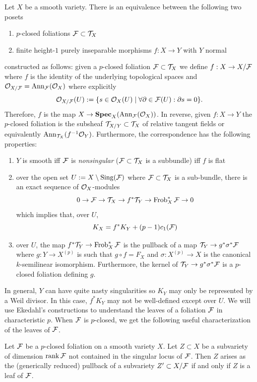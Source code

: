 \documentclass[main.tex]{subfiles}
\begin{document}
\begin{theorem}[Ekedahl] \label{thm:ekedahl}
Let $X$ be a smooth variety. There is an equivalence between the following two posets
\begin{enumerate}
    \item $p$-closed foliations $\mathcal{F} \subset \mathcal{T}_X$
    \item finite height-$1$ purely inseparable morphisms $f : X \to Y$ with $Y$ normal
\end{enumerate}
constructed as follows: given a $p$-closed foliation $\mathcal{F} \subset \mathcal{T}_X$ we define $f : X \to X / \mathcal{F}$ where $f$ is the identity of the underlying topological spaces and $\mathcal{O}_{X/\mathcal{F}} = \operatorname{\mathrm{Ann}}_{\mathcal{F}}(\mathcal{O}_X)$ where explicitly
\[ \mathcal{O}_{X/\mathcal{F}}(U) := \{ s \in \mathcal{O}_{X}(U) \mid \forall \partial \in \mathcal{F}(U) : \partial s = 0 \}. \]
Therefore, $f$ is the map $X \to \mathbf{Spec}_X(\operatorname{\mathrm{Ann}}_{\mathcal{F}}(\mathcal{O}_X))$.
In reverse, given $f : X \to Y$ the $p$-closed foliation is the subsheaf $\mathcal{T}_{X/Y} \subset \mathcal{T}_X$ of relative tangent fields or equivalently $\operatorname{\mathrm{Ann}}_{\mathcal{T}_X}(f^{-1} \mathcal{O}_Y)$. Furthermore, the correspondence has the following properties:
\begin{enumerate}
    \item $Y$ is smooth iff $\mathcal{F}$ is \textit{nonsingular} ($\mathcal{F} \subset \mathcal{T}_X$ is a subbundle) iff $f$ is flat
    \item over the open set $U := X \setminus \operatorname{\mathrm{Sing}}(\mathcal{F})$ where $\mathcal{F} \subset \mathcal{T}_X$ is a sub-bundle, there is an exact sequence of $\mathcal{O}_X$-modules
    \[ 0 \to \mathcal{F} \to \mathcal{T}_X \to f^* \mathcal{T}_Y \to \operatorname{\mathrm{Frob}}_X^* \mathcal{F} \to 0 \]
    which implies that, over $U$,
    \[ K_X = f^* K_Y + (p-1) c_1(\mathcal{F}) \]
    \item over $U$, the map $f^* \mathcal{T}_Y \to \operatorname{\mathrm{Frob}}_X^* \mathcal{F}$ is the pullback of a map $\mathcal{T}_Y \to g^* \sigma^* \mathcal{F}$ where $g : Y \to X^{(p)}$ is such that $g \circ f = F_X$ and $\sigma : X^{(p)} \to X$ is the canonical $k$-semilinear isomorphism. Furthermore, the kernel of $\mathcal{T}_Y \to g^* \sigma^* \mathcal{F}$ is a $p$-closed foliation defining $g$. 
\end{enumerate}
\end{theorem}

In general, $Y$ can have quite nasty singularities so $K_Y$ may only be represented by a Weil divisor. In this case, $f^* K_Y$ may not be well-defined except over $U$. We will use Ekedahl's constructions to understand the leaves of a foliation $\mathcal{F}$ in characteristic $p$. When $\mathcal{F}$ is $p$-closed, we get the following useful characterization of the leaves of $\mathcal{F}$.

\begin{lemma} \label{lem:tangent_leaf_pullback}
Let $\mathcal{F}$ be a $p$-closed foliation on a smooth variety $X$. Let $Z \subset X$ be a subvariety of dimension $\operatorname{\mathrm{rank}}{\mathcal{F}}$ not contained in the singular locus of $\mathcal{F}$. Then $Z$ arises as the (generically reduced) pullback of a subvariety $Z' \subset X / \mathcal{F}$ if and only if $Z$ is a leaf of $\mathcal{F}$.    
\end{lemma}
\end{document}
